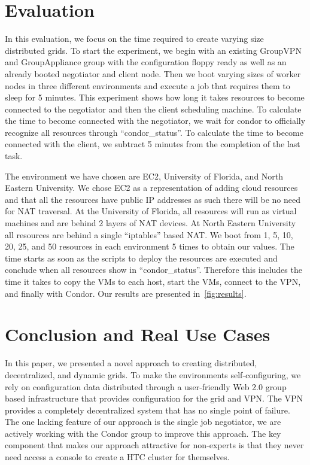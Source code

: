 \documentclass{sig-alternate}
\begin{document}
\section{Evaluation}
\label{evaluation}
In this evaluation, we focus on the time required to create varying size
distributed grids.  To start the experiment, we begin with an existing
GroupVPN and GroupAppliance group with the configuration floppy ready as well
as an already booted negotiator and client node.  Then we boot varying sizes of
worker nodes in three different environments and execute a job that requires
them to sleep for 5 minutes.  This experiment shows how long it takes resources
to become connected to the negotiator and then the client scheduling machine.
To calculate the time to become connected with the negotiator, we wait for
condor to officially recognize all resources through ``condor\_status''.  To
calculate the time to become connected with the client, we subtract 5 minutes
from the completion of the last task.

The environment we have chosen are EC2, University of Florida, and North
Eastern University.  We chose EC2 as a representation of adding cloud resources
and that all the resources have public IP addresses as such there will be no
need for NAT traversal.  At the University of Florida, all resources will run
as virtual machines and are behind 2 layers of NAT devices.  At North Eastern
University all resources are behind a single ``iptables'' based NAT.  We boot
from 1, 5, 10, 20, 25, and 50 resources in each environment 5 times to obtain
our values.  The time starts as soon as the scripts to deploy the resources
are executed and conclude when all resources show in ``condor\_status''.
Therefore this includes the time it takes to copy the VMs to each host, start
the VMs, connect to the VPN, and finally with Condor.  Our results are
presented in~\ref{fig:results}.

\section{Conclusion and Real Use Cases}
\label{conclusion}
In this paper, we presented a novel approach to creating distributed,
decentralized, and dynamic grids.  To make the environments self-configuring,
we rely on configuration data distributed through a user-friendly Web 2.0 group
based infrastructure that provides configuration for the grid and VPN.  The VPN
provides a completely decentralized system that has no single point of failure.
The one lacking feature of our approach is the single job negotiator, we are
actively working with the Condor group to improve this approach.  The key
component that makes our approach attractive for non-experts is that they never
need access a console to create a HTC cluster for themselves.
\end{document}
